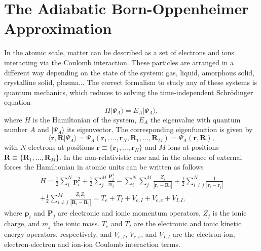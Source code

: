 
\chapter{The Adiabatic Born-Oppenheimer Approximation} %

\label{Chapter1} %


\newcommand{\keyword}[1]{\textbf{#1}}
\newcommand{\tabhead}[1]{\textbf{#1}}
\newcommand{\code}[1]{\texttt{#1}}
\newcommand{\file}[1]{\texttt{\bfseries#1}}
\newcommand{\option}[1]{\texttt{\itshape#1}}


In the atomic scale, matter can be described as a set of electrons and ions interacting via the Coulomb interaction. These particles are arranged in a different way depending on the state of the system: gas, liquid, amorphous 
solid, crystalline solid, plasma... The correct formalism to study any of these systems is quantum mechanics, which reduces to solving the time-independent Schr\"odinger equation
\begin{equation}
\label{schrodinger}
 H|\Psi_{A}\rangle=E_{A}|\Psi_{A}\rangle,
\end{equation}
where $H$ is the Hamiltonian of the system, $E_{A}$ the eigenvalue with quantum number $A$ and $|\Psi_{A}\rangle$ its eigenvector. The corresponding eigenfunction is given by
\begin{equation}
 \langle\mathbf{r},\mathbf{R}|\Psi_{A}\rangle=\Psi_{A}(\mathbf{r}_{1},\dots,\mathbf{r}_{N},\mathbf{R}_{1},\dots,\mathbf{R}_{M})=\Psi_{A}(\mathbf{r},\mathbf{R}),
\end{equation}
with $N$ electrons at positions $\mathbf{r}\equiv\{\mathbf{r}_{1},\dots,\mathbf{r}_{N}\}$ and $M$ ions at positions $\mathbf{R}\equiv\{\mathbf{R}_{1},\dots,\mathbf{R}_{M}\}$. In the non-relativistic case and in the absence of 
external forces the Hamiltonian in atomic units can be written as follows\cite{martin2004electronic}
\begin{multline}
 H=\frac{1}{2}\sum_{i}^{N}\mathbf{p}_{i}^{2}+\frac{1}{2}\sum_{j}^{M}\frac{\mathbf{P}_{j}^{2}}{m_{j}}-\sum_{i}^{N}\sum_{j}^{M}\frac{Z_{j}}{|\mathbf{r}_{i}-\mathbf{R}_{j}|}+\frac{1}{2}\sum_{i\ne j}^{N}\frac{1}{|\mathbf{r}_{i}-
 \mathbf{r}_{j}|}\\+\frac{1}{2}\sum_{i\ne j}^{M}\frac{Z_{i}Z_{j}}{|\mathbf{R}_{i}-\mathbf{R}_{j}|}=T_{e}+T_{I}+V_{e,I}+V_{e,e}+V_{I,I},
\end{multline}
where $\mathbf{p}_{i}$ and $\mathbf{P}_{j}$ are electronic and ionic momentum operators, $Z_{j}$ is the ionic charge, and $m_{j}$ the ionic mass. $T_{e}$ and $T_{I}$ are the electronic and ionic kinetic energy operators, 
respectively, and $V_{e,I}$, $V_{e,e}$, and $V_{I,I}$ are the electron-ion, electron-electron and ion-ion Coulomb interaction terms.  \\

